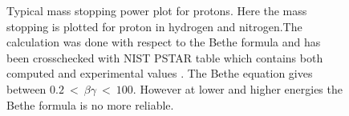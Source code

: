 \begin{figure}[ht]
	
	\caption[Typical mass stopping power plot for protons]{Typical mass stopping power plot for protons. Here the mass stopping is plotted for proton in hydrogen and nitrogen.The calculation was done with respect to the Bethe formula and has been crosschecked with NIST PSTAR table which contains both computed and experimental values \cite{Seltzer1993}. The Bethe equation gives between \(0.2\ <\ \beta\gamma\ <\ 100\). However at lower and higher energies the Bethe formula is no more reliable.}
	\label{chap3:bethe1}
\end{figure}
